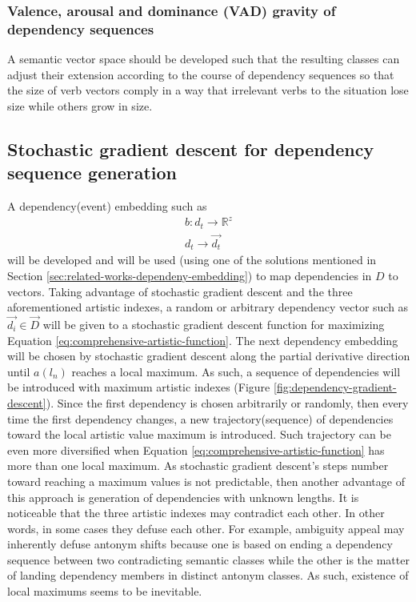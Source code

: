 \documentclass{article}
\begin{document}
	\subsubsection{Valence, arousal and dominance (VAD) gravity of dependency sequences} \label{sec:methodology-vad}
	A semantic vector space should be developed such that the resulting classes can adjust their extension according to the course of dependency sequences so that the size of verb vectors comply in a way that irrelevant verbs to the situation lose size while others grow in size. 
	
	\subsection{Stochastic gradient descent for dependency sequence generation}\label{sec:methodology-stochastic-gradient-descent} A dependency(event) embedding such as 
	\begin{equation}
	\begin{split}
	b:d_t\longrightarrow \mathbb{R}^z
	\\
	d_t\longrightarrow\vec{d_t}
	\end{split}
	\label{eq:script-embedding-function}
	\end{equation} 
	will be developed and will be used (using one of the solutions mentioned in Section \ref{sec:related-works-dependeny-embedding}) to map dependencies in $D$ to vectors. Taking advantage of stochastic gradient descent and the three aforementioned artistic indexes, a random or arbitrary dependency vector such as $\vec{d_i} \in \vec{D}$ will be given to a stochastic gradient descent function for maximizing Equation \ref{eq:comprehensive-artistic-function}. The next dependency embedding will be chosen by stochastic gradient descent along the partial derivative direction until $a(l_n)$ reaches a local maximum. As such, a sequence of dependencies will be introduced with maximum artistic indexes (Figure \ref{fig:dependency-gradient-descent}). Since the first dependency is chosen arbitrarily or randomly, then every time the first dependency changes, a new trajectory(sequence) of dependencies toward the local artistic value maximum is introduced. Such trajectory can be even more diversified when Equation \ref{eq:comprehensive-artistic-function} has more than one local maximum. As stochastic gradient descent's steps number toward reaching a maximum values is not predictable, then another advantage of this approach is generation of dependencies with unknown lengths.
	It is noticeable that the three artistic indexes may contradict each other. In other words, in some cases they defuse each other. For example, ambiguity appeal may inherently defuse antonym shifts because one is based on ending a dependency sequence between two contradicting semantic classes while the other is the matter of landing dependency members in distinct antonym classes. As such, existence of local maximums seems to be inevitable.      
\end{document}
